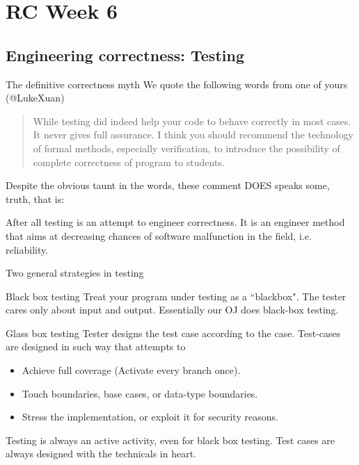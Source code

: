 \section{RC Week 6}

\subsection{Engineering correctness: Testing}
\begin{frame}{The definitive correctness myth}
We quote the following words from one of yours (@LukeXuan)
\begin{quotation}
	While testing did indeed help your code to behave correctly in most cases. It never gives full assurance. I think you should recommend the technology of formal methods, especially verification, to introduce the possibility of complete correctness of program to students.
\end{quotation}
Despite the obvious taunt in the words, these comment DOES speaks some, truth, that is:
\begin{center}
\end{center}
After all testing is an attempt to engineer correctness. It is an engineer method that aims at decreasing chances of software malfunction in the field, i.e. reliability.
\end{frame}

\begin{frame}{Two general strategies in testing}
\begin{block}{Black box testing}
	Treat your program under testing as a ``blackbox". The tester cares only about input and output. Essentially our OJ does black-box testing.
\end{block}
\begin{block}{Glass box testing}
	Tester designs the test case according to the case. Test-cases are designed in such way that attempts to
	\begin{itemize}
		\item Achieve full coverage (Activate every branch once).
		\item Touch boundaries, base cases, or data-type boundaries.
		\item Stress the implementation, or exploit it for security reasons.
	\end{itemize}
\end{block}
\alert{Testing is always an active activity}, even for black box testing. Test cases are always designed with the technicals in heart.
\end{frame}


